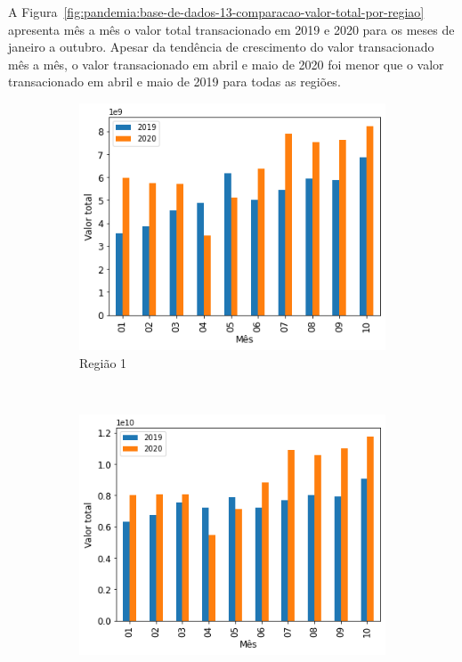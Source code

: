 A Figura~\ref{fig:pandemia:base-de-dados-13-comparacao-valor-total-por-regiao} apresenta mês a mês o valor total transacionado em 2019 e 2020 para os meses de janeiro a outubro. Apesar da tendência de crescimento do valor transacionado mês a mês, o valor transacionado em abril e maio de 2020 foi menor que o valor transacionado em abril e maio de 2019 para todas as regiões.

\begin{figure}[htb] 
    \centering 
    \caption{Comparação do valor mensal transacionado por região entre 2019 e 2020}
    \label{fig:pandemia:base-de-dados-13-comparacao-valor-total-por-regiao} 
    \begin{subfigure}[b]{0.45\textwidth}
        \includegraphics[scale=0.45]{images/base-de-dados-13.1-comparacao-valor-total-por-regiao.png}
        \caption{Região 1}
        \label{fig:pandemia:base-de-dados-13.1-comparacao-valor-total-por-regiao}
    \end{subfigure} ~ \quad
    \begin{subfigure}[b]{0.45\textwidth}
        \includegraphics[scale=0.45]{images/base-de-dados-13.2-comparacao-valor-total-por-regiao.png}

\end{subfigure}
\end{figure}
